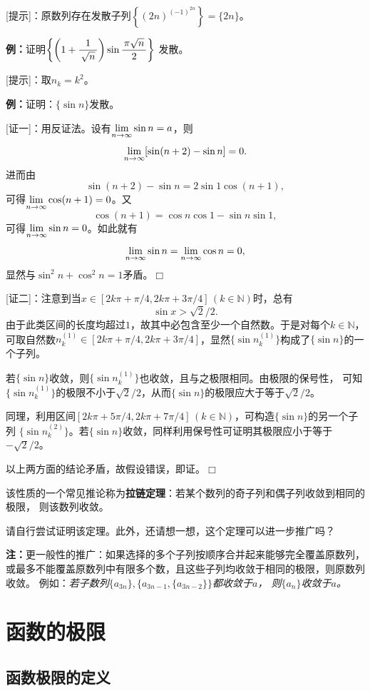 [提示]：原数列存在发散子列$\left\{(2n)^{(-1)^{2n}}\right\}=\{2n\}$。

{\bf 例：}证明$\left\{\left(1+\displaystyle\frac{\,{1}\,}{\,{\sqrt n}\,}\right)\sin\displaystyle\frac{\,{\pi\sqrt n}\,}{\,{2}\,}\right\}$
发散。

[提示]：取$n_k=k^2$。 

\begin{shaded}
	{\bf 例：}证明：$\{\sin n\}$发散。
	
	[证一]：用反证法。设有$\lim\limits_{n\to\infty}\sin n=a$，则
	$$\lim\limits_{n\to\infty}[\sin(n+2)-\sin n]=0.$$
	进而由
	$$\sin(n+2)-\sin n=2\sin 1\cos(n+1),$$
	可得$\lim\limits_{n\to\infty}\cos(n+1)=0$。又
	$$\cos(n+1)=\cos n\cos 1-\sin n\sin 1,$$
	可得$\lim\limits_{n\to\infty}\sin n=0$。如此就有
	$$\lim\limits_{n\to\infty}\sin n=\lim\limits_{n\to\infty}\cos n=0,$$
	显然与$\sin^2n+\cos^2n=1$矛盾。\hfill $\Box$
	
	[证二]：注意到当$x\in[2k\pi+\pi/4,2k\pi+3\pi/4]\,(k\in\mathbb{N})$时，总有
	$$\sin x>\sqrt2/2.$$
	由于此类区间的长度均超过$1$，故其中必包含至少一个自然数。于是对每个$k\in\mathbb{N}$，
	可取自然数$n^{(1)}_k\in[2k\pi+\pi/4,2k\pi+3\pi/4]$，显然$\{\sin{n^{(1)}_k}\}$构成了$\{\sin
	n\}$的一个子列。
	
	若$\{\sin n\}$收敛，则$\{\sin{n^{(1)}_k}\}$也收敛，且与之极限相同。由极限的保号性，
	可知$\{\sin{n^{(1)}_k}\}$的极限不小于$\sqrt2/2$，从而$\{\sin
	n\}$的极限应大于等于$\sqrt2/2$。
	
	同理，利用区间$[2k\pi+5\pi/4,2k\pi+7\pi/4]\,(k\in\mathbb{N})$，可构造$\{\sin
	n\}$的另一个子列 $\{\sin{n^{(2)}_k}\}$。若$\{\sin n\}$收敛，同样利用保号性可证明其极限应小于等于$-\sqrt2/2$。
	
	以上两方面的结论矛盾，故假设错误，即证。\hfill $\Box$
\end{shaded}

该性质的一个常见推论称为{\bf 拉链定理}：若某个数列的奇子列和偶子列收敛到相同的极限，
则该数列收敛。

请自行尝试证明该定理。此外，还请想一想，这个定理可以进一步推广吗？

{\bf 注：}更一般性的推广：如果选择的多个子列按顺序合并起来能够完全覆盖原数列，
或最多不能覆盖原数列中有限多个数，且这些子列均收敛于相同的极限，则原数列收敛。
例如：{\it 若子数列$\{a_{3n}\},\{a_{3n-1},\{a_{3n-2}\}\}$都收敛于$a$，
则$\{a_{n}\}$收敛于$a$。}

\section{函数的极限}

\subsection{函数极限的定义}

